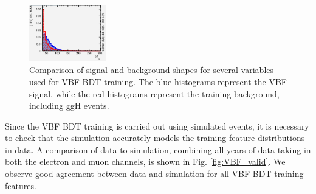 \begin{figure}[tb]
\begin{center}
		\includegraphics[width=0.3\textwidth]{fig/MVA/ptj2_vbf.png}
	\end{center}
	\caption{Comparison of signal and background shapes for several variables used for VBF BDT training. The blue histograms represent the VBF signal, while the red histograms represent the training background, including ggH \hzg{} events.}
	\label{fig:vbf_bdt_features}
\end{figure}

Since the VBF BDT training is carried out using simulated events, it is necessary to check that the simulation accurately models the training feature distributions in data. 
A comparison of data to simulation, combining all years of data-taking in both the electron and muon channels, is shown in Fig. \ref{fig:VBF_valid}. We observe good agreement between
data and simulation for all VBF BDT training features. 

